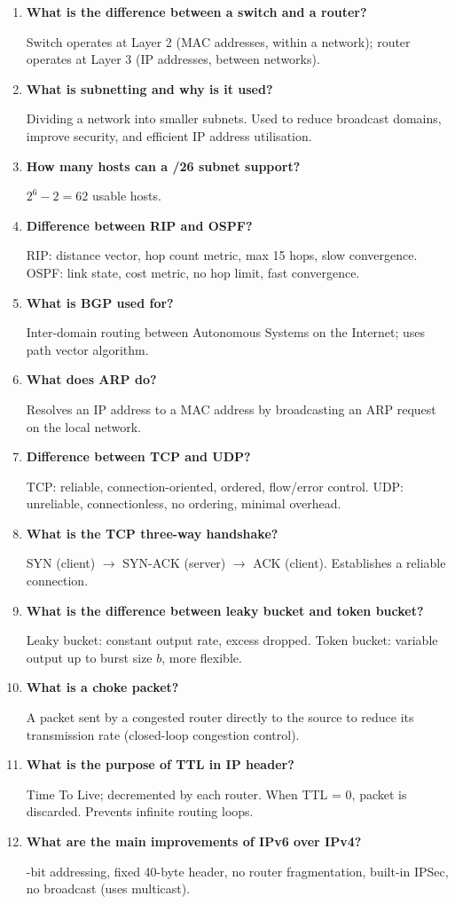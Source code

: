 \documentclass[12pt,a4paper]{article}
\newcommand{\Q}[1]{\textbf{#1}\par\noindent\ignorespaces}
\begin{document}
\begin{tcolorbox}[exambox, title={\textbf{Frequently Asked / Viva Questions}}]
\begin{enumerate}[leftmargin=*, topsep=0pt, label=\textbf{Q\arabic*.}, itemsep=8pt]
  \item \Q{What is the difference between a switch and a router?} Switch operates at Layer 2 (MAC addresses, within a network); router operates at Layer 3 (IP addresses, between networks).
  \item \Q{What is subnetting and why is it used?} Dividing a network into smaller subnets. Used to reduce broadcast domains, improve security, and efficient IP address utilisation.
  \item \Q{How many hosts can a /26 subnet support?} $2^6 - 2 = 62$ usable hosts.
  \item \Q{Difference between RIP and OSPF?} RIP: distance vector, hop count metric, max 15 hops, slow convergence. OSPF: link state, cost metric, no hop limit, fast convergence.
  \item \Q{What is BGP used for?} Inter-domain routing between Autonomous Systems on the Internet; uses path vector algorithm.
  \item \Q{What does ARP do?} Resolves an IP address to a MAC address by broadcasting an ARP request on the local network.
  \item \Q{Difference between TCP and UDP?} TCP: reliable, connection-oriented, ordered, flow/error control. UDP: unreliable, connectionless, no ordering, minimal overhead.
  \item \Q{What is the TCP three-way handshake?} SYN (client) $\to$ SYN-ACK (server) $\to$ ACK (client). Establishes a reliable connection.
  \item \Q{What is the difference between leaky bucket and token bucket?} Leaky bucket: constant output rate, excess dropped. Token bucket: variable output up to burst size $b$, more flexible.
  \item \Q{What is a choke packet?} A packet sent by a congested router directly to the source to reduce its transmission rate (closed-loop congestion control).
  \item \Q{What is the purpose of TTL in IP header?} Time To Live; decremented by each router. When TTL = 0, packet is discarded. Prevents infinite routing loops.
  \item \Q{What are the main improvements of IPv6 over IPv4?} 128-bit addressing, fixed 40-byte header, no router fragmentation, built-in IPSec, no broadcast (uses multicast).
\end{enumerate}
\end{tcolorbox}
\end{document}
